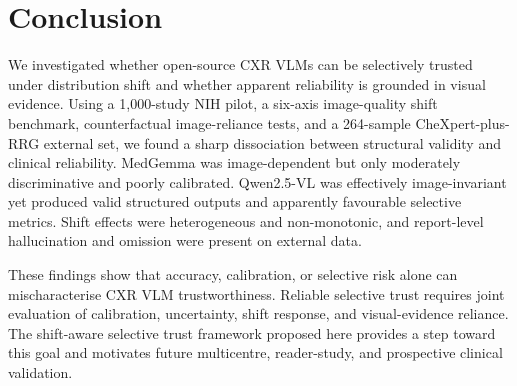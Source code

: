 \section{Conclusion}

We investigated whether open-source CXR VLMs can be selectively trusted under distribution shift and whether apparent reliability is grounded in visual evidence. Using a 1,000-study NIH pilot, a six-axis image-quality shift benchmark, counterfactual image-reliance tests, and a 264-sample CheXpert-plus-RRG external set, we found a sharp dissociation between structural validity and clinical reliability. MedGemma was image-dependent but only moderately discriminative and poorly calibrated. Qwen2.5-VL was effectively image-invariant yet produced valid structured outputs and apparently favourable selective metrics. Shift effects were heterogeneous and non-monotonic, and report-level hallucination and omission were present on external data.

These findings show that accuracy, calibration, or selective risk alone can mischaracterise CXR VLM trustworthiness. Reliable selective trust requires joint evaluation of calibration, uncertainty, shift response, and visual-evidence reliance. The shift-aware selective trust framework proposed here provides a step toward this goal and motivates future multicentre, reader-study, and prospective clinical validation.
